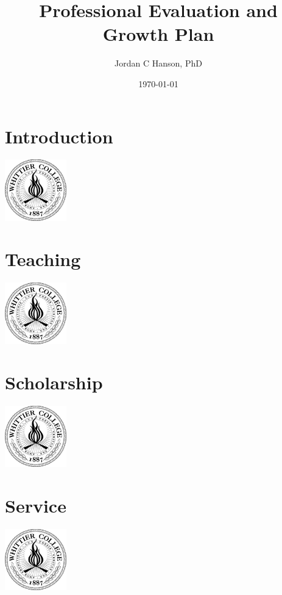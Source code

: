 \documentclass[11pt]{book}
\title{Professional Evaluation and Growth Plan}
\author{Jordan C Hanson, PhD}
\date{\today}
\begin{document}
\maketitle
\tableofcontents

\chapter{Introduction}
\centering
\includegraphics[width=0.2\textwidth]{figures/WhittierCollegeSeal.png}
\begin{flushleft}

\end{flushleft}

\chapter{Teaching}
\centering
\includegraphics[width=0.2\textwidth]{figures/WhittierCollegeSeal.png}
\begin{flushleft}

\end{flushleft}

\chapter{Scholarship}
\centering
\includegraphics[width=0.2\textwidth]{figures/WhittierCollegeSeal.png}
\begin{flushleft}

\end{flushleft}

\chapter{Service}
\centering
\includegraphics[width=0.2\textwidth]{figures/WhittierCollegeSeal.png}
\begin{flushleft}

\end{flushleft}
\end{document}
